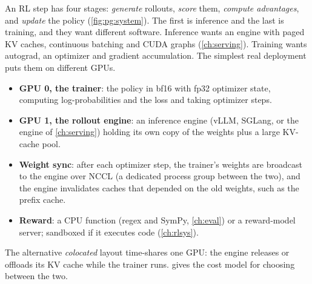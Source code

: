 An RL step has four stages: \emph{generate} rollouts, \emph{score} them, \emph{compute
advantages}, and \emph{update} the policy (\cref{fig:pg:system}). The first is inference and
the last is training, and they want different software. Inference wants an engine with paged
KV caches, continuous batching and CUDA graphs (\cref{ch:serving}). Training wants autograd,
an optimizer and gradient accumulation. The simplest real deployment puts them on different
GPUs.
\begin{itemize}
\item \textbf{GPU 0, the trainer}: the policy in bf16 with fp32 optimizer state, computing
  log-probabilities and the loss and taking optimizer steps.
\item \textbf{GPU 1, the rollout engine}: an inference engine (vLLM, SGLang, or the engine of
  \cref{ch:serving}) holding its own copy of the weights plus a large KV-cache pool.
\item \textbf{Weight sync}: after each optimizer step, the trainer's weights are broadcast to
  the engine over NCCL (a dedicated process group between the two), and the engine
  invalidates caches that depended on the old weights, such as the prefix cache.
\item \textbf{Reward}: a CPU function (regex and SymPy, \cref{ch:eval}) or a reward-model
  server; sandboxed if it executes code (\cref{ch:rlsys}).
\end{itemize}
The alternative \emph{colocated} layout time-shares one GPU: the engine releases or offloads
its KV cache while the trainer runs.  gives the cost model for choosing between
the two.

